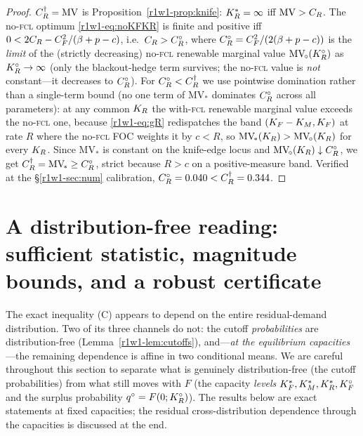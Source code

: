 \begin{proof}
$C_R^{\dagger}=\mathrm{MV}$ is Proposition~\ref{r1w1-prop:knife}: $K_R^{*}=\infty$ iff
$\mathrm{MV}>C_R$. The no-\textsc{fcl} optimum \eqref{r1w1-eq:noKFKR} is finite and
positive iff $0<2C_R-C_F^2/(\beta+p-c)$, i.e.\ $C_R>C_R^{\circ}$, where
$C_R^{\circ}=C_F^2/(2(\beta+p-c))$ is the \emph{limit} of the (strictly decreasing) no-\textsc{fcl}
renewable marginal value $\mathrm{MV}_{\!\circ}(K_R^{\circ})$ as $K_R^{\circ}\to\infty$ (only the
blackout-hedge term survives; the no-\textsc{fcl} value is \emph{not} constant---it
decreases to $C_R^{\circ}$). For $C_R^{\circ}<C_R^{\dagger}$ we use pointwise domination
rather than a single-term bound (no one term of $\mathrm{MV}_{\!*}$ dominates $C_R^{\circ}$
across all parameters): at any common $K_R$ the with-\textsc{fcl} renewable marginal value
exceeds the no-\textsc{fcl} one, because \eqref{r1w1-eq:gR} redispatches the band
$(K_F-K_M,K_F)$ at rate $R$ where the no-\textsc{fcl} FOC weights it by $c<R$, so
$\mathrm{MV}_{\!*}(K_R)>\mathrm{MV}_{\!\circ}(K_R)$ for every $K_R$. Since $\mathrm{MV}_{\!*}$
is constant on the knife-edge locus and $\mathrm{MV}_{\!\circ}(K_R)\downarrow C_R^{\circ}$, we
get $C_R^{\dagger}=\mathrm{MV}_{\!*}\ge C_R^{\circ}$, strict because $R>c$ on a
positive-measure band. Verified at the \S\ref{r1w1-sec:num} calibration,
$C_R^{\circ}=0.040<C_R^{\dagger}=0.344$.
\end{proof}

\section{A distribution-free reading: sufficient statistic, magnitude bounds, and a robust certificate}\label{r1w1-sec:robustcarbon}

The exact inequality (C) appears to depend on the entire residual-demand
distribution. Two of its three channels do not: the cutoff \emph{probabilities}
are distribution-free (Lemma~\ref{r1w1-lem:cutoffs}), and---\emph{at the equilibrium
capacities}---the remaining dependence is affine in two conditional means. We are
careful throughout this section to separate what is genuinely distribution-free
(the cutoff probabilities) from what still moves with $F$ (the capacity
\emph{levels} $K_F^{*},K_M^{*},K_R^{*},K_F^{\circ}$ and the surplus probability
$q^{\circ}=F(0;K_R^{\circ})$). The results below are exact statements at fixed
capacities; the residual cross-distribution dependence through the capacities is
discussed at the end.

